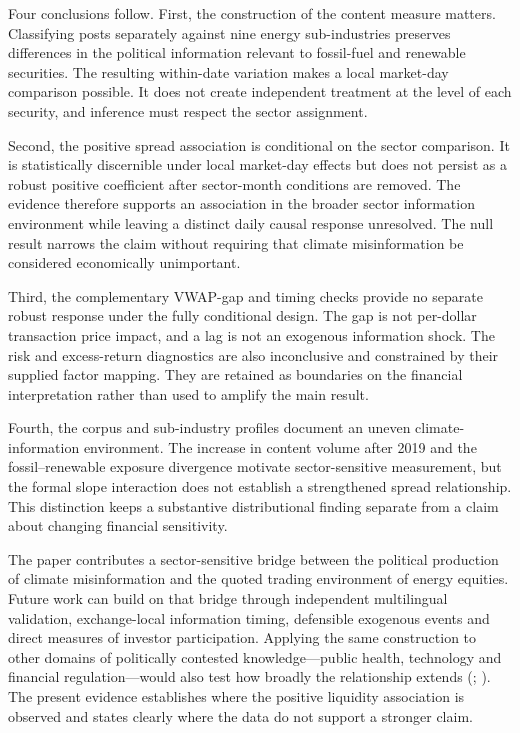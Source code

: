\documentclass{article}
\theoremstyle{plain}
\begin{document}
Four conclusions follow. First, the construction of the content measure matters. Classifying posts separately against nine energy sub-industries preserves differences in the political information relevant to fossil-fuel and renewable securities. The resulting within-date variation makes a local market-day comparison possible. It does not create independent treatment at the level of each security, and inference must respect the sector assignment.

Second, the positive spread association is conditional on the sector comparison. It is statistically discernible under local market-day effects but does not persist as a robust positive coefficient after sector-month conditions are removed. The evidence therefore supports an association in the broader sector information environment while leaving a distinct daily causal response unresolved. The null result narrows the claim without requiring that climate misinformation be considered economically unimportant.

Third, the complementary VWAP-gap and timing checks provide no separate robust response under the fully conditional design. The gap is not per-dollar transaction price impact, and a lag is not an exogenous information shock. The risk and excess-return diagnostics are also inconclusive and constrained by their supplied factor mapping. They are retained as boundaries on the financial interpretation rather than used to amplify the main result.

Fourth, the corpus and sub-industry profiles document an uneven climate-information environment. The increase in content volume after 2019 and the fossil--renewable exposure divergence motivate sector-sensitive measurement, but the formal slope interaction does not establish a strengthened spread relationship. This distinction keeps a substantive distributional finding separate from a claim about changing financial sensitivity.

The paper contributes a sector-sensitive bridge between the political production of climate misinformation and the quoted trading environment of energy equities. Future work can build on that bridge through independent multilingual validation, exchange-local information timing, defensible exogenous events and direct measures of investor participation. Applying the same construction to other domains of politically contested knowledge---public health, technology and financial regulation---would also test how broadly the relationship extends (\cite{lins2017social}; \cite{taber2006motivated}). The present evidence establishes where the positive liquidity association is observed and states clearly where the data do not support a stronger claim.
\end{document}
